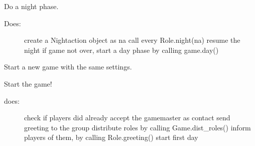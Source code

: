 \documentclass[letterpaper,10pt,english]{sphinxmanual}
\begin{document}
\begin{fulllineitems}

\begin{fulllineitems}
\label{\detokenize{chatwolf:chatwolf.game.Game.night}}
Do a night phase.
\begin{description}
\item[{Does:}] \leavevmode
create a Nightaction object as na
call every Role.night(na)
resume the night
if game not over, start a day phase by calling game.day()

\end{description}

\end{fulllineitems}


\begin{fulllineitems}
\label{\detokenize{chatwolf:chatwolf.game.Game.restart}}
Start a new game with the same settings.

\end{fulllineitems}


\begin{fulllineitems}
\label{\detokenize{chatwolf:chatwolf.game.Game.save_config}}
\end{fulllineitems}


\begin{fulllineitems}
\label{\detokenize{chatwolf:chatwolf.game.Game.start}}
Start the game!
\begin{description}
\item[{does:}] \leavevmode
check if players did already accept the game\sphinxhyphen{}master as contact
send greeting to the group
distribute roles by calling Game.dist\_roles()
inform players of them, by calling Role.greeting()
start first day

\end{description}

\end{fulllineitems}


\end{fulllineitems}
\end{document}
